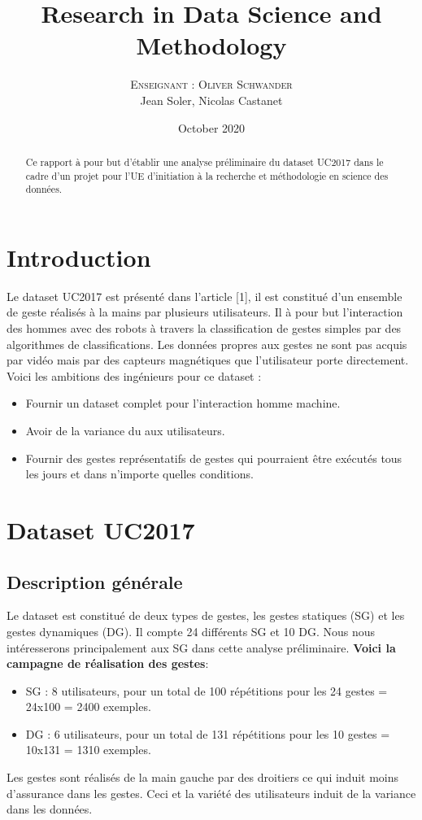 \documentclass[12pt,a4paper,roman]{article}
\title{Research in Data Science and Methodology}
\author{%
\textsc{Enseignant : Oliver Schwander} \\%
\textsc Jean Soler, Nicolas Castanet%
}
\date{October 2020}
\begin{document}
\maketitle
\begin{abstract}
Ce rapport à pour but d'établir une analyse préliminaire du dataset UC2017 dans le cadre d'un projet pour l'UE d'initiation à la recherche et méthodologie en science des données.
\end{abstract}
\section{Introduction}
Le dataset UC2017 est présenté dans l'article [1], il est constitué d'un ensemble de geste réalisés à la mains par plusieurs utilisateurs. Il à pour but l'interaction des hommes avec des robots à travers la classification de gestes simples par des algorithmes de classifications. 
\newline
Les données propres aux gestes ne sont pas acquis par vidéo mais par des capteurs magnétiques que l'utilisateur porte directement.
Voici les ambitions des ingénieurs pour ce dataset :
\begin{itemize}
    \item Fournir un dataset complet pour l'interaction homme machine.
    \item Avoir de la variance du aux utilisateurs.
    \item Fournir des gestes représentatifs de gestes qui pourraient être exécutés tous les jours et dans n'importe quelles conditions.
\end{itemize}

\section{Dataset UC2017}
\subsection{Description générale}
Le dataset est constitué de deux types de gestes, les gestes statiques (SG) et les gestes dynamiques (DG). Il compte 24 différents SG et 10 DG. Nous nous intéresserons principalement aux SG dans cette analyse préliminaire. 
\newline
\textbf{Voici la campagne de réalisation des gestes}:
\begin{itemize}
    \item SG : 8 utilisateurs, pour un total de 100 répétitions pour les 24 gestes = 24x100 = 2400 exemples.
    \item DG : 6 utilisateurs, pour un total de 131 répétitions pour les 10 gestes = 10x131 = 1310 exemples.
\end{itemize}
Les gestes sont réalisés de la main gauche par des droitiers ce qui induit moins d'assurance dans les gestes. Ceci et la variété des utilisateurs induit de la variance dans les données.
\end{document}
